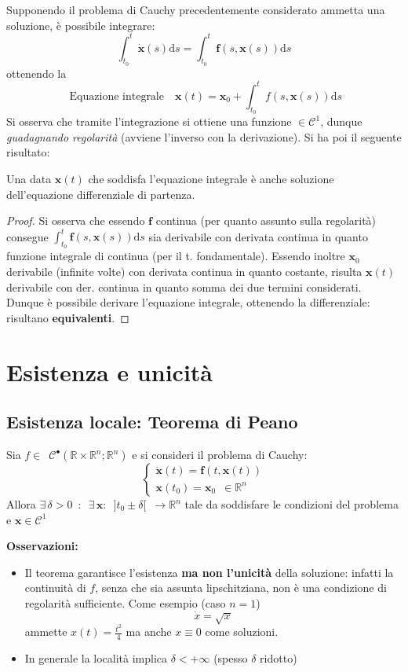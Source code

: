 \documentclass[10pt, oneside]{book}
\theoremstyle{plain}
\begin{document}
Supponendo il problema di Cauchy precedentemente considerato ammetta una soluzione, è possibile integrare:
\[\int_{t_0}^{t}\dot{\mathbf{x}}(s)\textrm{d}s = \int_{t_0}^{t}\mathbf{f}(s, \mathbf{x}(s))\textrm{d}s\]
ottenendo la
\[\boxed{\textrm{ Equazione integrale} \quad \mathbf{x}(t) = \mathbf{x}_0 + \int_{t_0}^{t}f(s, \mathbf{x}(s))\textrm{d}s }\]
Si osserva che tramite l'integrazione si ottiene una funzione $\in \mathcal{C}^1$, dunque \textit{guadagnando regolarità} (avviene l'inverso con la derivazione). Si ha poi il seguente risultato:
\begin{prop}
Una data $\mathbf{x}(t)$ che soddisfa l'equazione integrale è anche soluzione dell'equazione differenziale di partenza.
\end{prop}
\begin{proof}
Si osserva che essendo $\mathbf{f}$ continua (per quanto assunto sulla regolarità) consegue $\displaystyle \int_{t_0}^{t}\mathbf{f}(s, \mathbf{x}(s))\textrm{d}s$ sia derivabile con derivata continua in quanto funzione integrale di continua (per il t. fondamentale). Essendo inoltre $\mathbf{x}_0$ derivabile (infinite volte) con derivata continua in quanto costante, risulta $\mathbf{x}(t)$ derivabile con der. continua in quanto somma dei due termini considerati. Dunque è possibile derivare l'equazione integrale, ottenendo la differenziale: risultano \textbf{equivalenti}.
\end{proof}

\section{Esistenza e unicità}
\subsection{Esistenza locale: Teorema di Peano}
\begin{ther}
Sia $f \in \enspace \mathcal{C}^{•}(\mathbb{R} \times \mathbb{R}^n; \mathbb{R}^n)$ e si consideri il problema di Cauchy:
\[\begin{cases}
\dot{\mathbf{x}}(t) = \mathbf{f}(t, \mathbf{x}(t))\\
\mathbf{x}(t_0) = \mathbf{x}_0 \enspace \in \mathbb{R}^n
\end{cases}\]
Allora $\exists \, \delta > 0 \enspace : \enspace \exists \, \mathbf{x} : \enspace ]t_0 \pm \delta[ \enspace \rightarrow \mathbb{R}^n$ tale da soddisfare le condizioni del problema e $\mathbf{x} \in \mathcal{C}^1$
\end{ther}
\textbf{Osservazioni:}
\begin{itemize}
\item Il teorema garantisce l'esistenza \textbf{ma non l'unicità} della soluzione: infatti la continuità di $f$, senza che sia assunta lipschitziana, non è una condizione di regolarità sufficiente. Come esempio (caso $n=1$)
\[\dot{x} = \sqrt{x}\]
ammette $\displaystyle x(t) = \frac{t^2}{4}$ ma anche $x \equiv 0$ come soluzioni.
\item In generale la località implica $\delta < + \infty$ (spesso $\delta$ ridotto)
\end{itemize}
\end{document}
